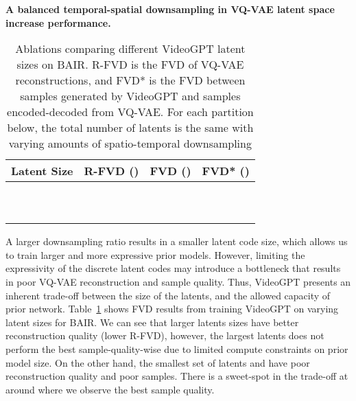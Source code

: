 \documentclass{article}
\begin{document}
\textbf{A balanced temporal-spatial downsampling in VQ-VAE latent space increase performance.}
\begin{table}[H]
\begin{minipage}{.5\textwidth}
\center
\caption{Ablations comparing different VideoGPT latent sizes on BAIR. R-FVD is the FVD of VQ-VAE reconstructions, and FVD* is the FVD between samples generated by VideoGPT and samples encoded-decoded from VQ-VAE. For each partition below, the total number of latents is the same with varying amounts of spatio-temporal downsampling}
\label{table:abl_latent_size}
\begin{tabular}{@{}cccc@{}}
\toprule
Latent Size                      & R-FVD () & FVD ()       & FVD* ()     \\ \midrule
          &                &           &           \\
            &               &           &           \\ \midrule
            &                &           &           \\ \midrule
          &                &           &           \\
          &                &           &           \\
         &                &           &           \\ \midrule
          &                &           &          \\
 &       &  &  \\ \midrule
          &                &           &          \\
         &                &           &          \\ \bottomrule
\end{tabular}
\end{minipage}

\end{table}

A larger downsampling ratio results in a smaller latent code size, which allows us to train larger and more expressive prior models. However, limiting the expressivity of the discrete latent codes may introduce a bottleneck that results in poor VQ-VAE reconstruction and sample quality. Thus, VideoGPT presents an inherent trade-off between the size of the latents, and the allowed capacity of prior network. Table~\ref{table:abl_latent_size} shows FVD results from training VideoGPT on varying latent sizes for BAIR. We can see that larger latents sizes have better reconstruction quality (lower R-FVD), however, the largest latents  does not perform the best sample-quality-wise due to limited compute constraints on prior model size. On the other hand, the smallest set of latents  and  have poor reconstruction quality and poor samples. There is a sweet-spot in the trade-off at around  where we observe the best sample quality.
\end{document}
